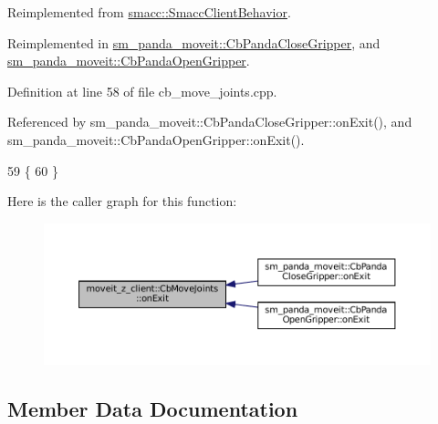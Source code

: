 Reimplemented from \hyperlink{classsmacc_1_1SmaccClientBehavior_ac0cd72d42bd00425362a97c9803ecce5}{smacc\+::\+Smacc\+Client\+Behavior}.



Reimplemented in \hyperlink{classsm__panda__moveit_1_1CbPandaCloseGripper_a0a51d63684baaba9d33fe272db237593}{sm\+\_\+panda\+\_\+moveit\+::\+Cb\+Panda\+Close\+Gripper}, and \hyperlink{classsm__panda__moveit_1_1CbPandaOpenGripper_a40378849466821989b11f0561945f8fe}{sm\+\_\+panda\+\_\+moveit\+::\+Cb\+Panda\+Open\+Gripper}.



Definition at line 58 of file cb\+\_\+move\+\_\+joints.\+cpp.



Referenced by sm\+\_\+panda\+\_\+moveit\+::\+Cb\+Panda\+Close\+Gripper\+::on\+Exit(), and sm\+\_\+panda\+\_\+moveit\+::\+Cb\+Panda\+Open\+Gripper\+::on\+Exit().


\begin{DoxyCode}
59 \{
60 \}
\end{DoxyCode}
Here is the caller graph for this function\+:
\nopagebreak
\begin{figure}[H]
\begin{center}
\leavevmode
\includegraphics[width=350pt]{classmoveit__z__client_1_1CbMoveJoints_a104abb9c8f8ebb04a6e5c8e84b473add_icgraph}
\end{center}
\end{figure}


\subsection{Member Data Documentation}
\mbox{\label{classmoveit__z__client_1_1CbMoveJoints_a0f52577dd2fccf25f36c4c93e733c0f4}} 
